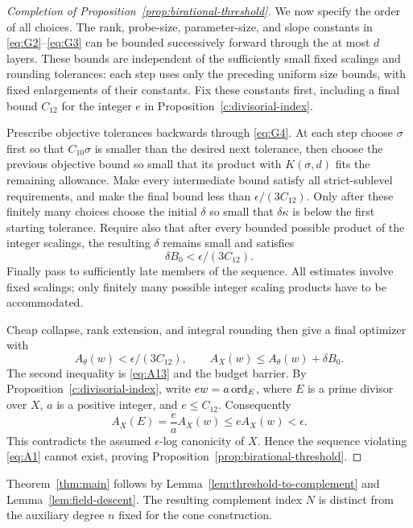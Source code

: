 \label{c:choice-order}
\begin{proof}[Completion of Proposition~\ref{prop:birational-threshold}]
We now specify the order of all choices.  The rank,
probe-size, parameter-size, and slope constants in
\eqref{eq:G2}--\eqref{eq:G3} can be bounded successively
forward through the at most \(d\) layers.  These
bounds are independent of the sufficiently small
fixed scalings and rounding tolerances: each step
uses only the preceding uniform size bounds, with
fixed enlargements of their constants.  Fix these
constants first, including a final bound \(C_{12}\)
for the integer \(e\) in Proposition~\ref{c:divisorial-index}.

Prescribe objective tolerances backwards through
\eqref{eq:G4}.  At each step choose \(\sigma\) first
so that \(C_{10}\sigma\) is smaller than the desired
next tolerance, then choose the previous objective
bound so small that its product with \(K(\sigma,d)\)
fits the remaining allowance.  Make every intermediate
bound satisfy all strict-sublevel requirements, and
make the final bound less than \(\epsilon/(3C_{12})\).
Only after these finitely many choices choose the
initial \(\delta\) so small that \(\delta\kappa\)
is below the first starting tolerance.  Require also
that after every bounded possible product of the
integer scalings, the resulting \(\delta\) remains
small and satisfies
\[
                         \delta B_0<\epsilon/(3C_{12}).
\]
Finally pass to sufficiently late members of the
sequence.  All estimates involve fixed scalings;
only finitely many possible integer scaling products
have to be accommodated.

Cheap collapse, rank extension, and integral rounding
then give a final optimizer with
\[
 A_\theta(w)<\epsilon/(3C_{12}),
 \qquad
 A_X(w)\le A_\theta(w)+\delta B_0.
\]
The second inequality is \eqref{eq:A13} and the
budget barrier.  By Proposition~\ref{c:divisorial-index},
write \(ew=a\operatorname{ord}_E\), where \(E\) is a prime divisor
over \(X\), \(a\) is a positive integer, and
\(e\le C_{12}\).  Consequently
\[
           A_X(E)=\frac{e}{a}A_X(w)
                    \le e A_X(w)<\epsilon.
\]
This contradicts the assumed \(\epsilon\)-log canonicity
of \(X\).  Hence the sequence violating
\eqref{eq:A1} cannot exist, proving
Proposition~\ref{prop:birational-threshold}.
\end{proof}

Theorem~\ref{thm:main} follows by
Lemma~\ref{lem:threshold-to-complement} and
Lemma~\ref{lem:field-descent}.  The resulting complement
index \(N\) is distinct from the auxiliary degree
\(n\) fixed for the cone construction.
